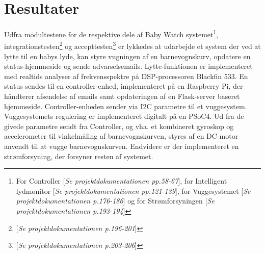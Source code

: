\chapter{Resultater}

Udfra modultestene for de respektive dele af Baby Watch systemet\footnote{For Controller [\textit{Se projektdokumentationen pp.58-67}], for Intelligent lydmonitor [\textit{Se projektdokumentationen pp.121-139}], for Vuggesystemet [\textit{Se projektdokumentationen p.176-186}] og for Strømforsyningen [\textit{Se projektdokumentationen p.193-194}]}, integrationstesten\footnote{[\textit{Se projektdokumentationen p.196-201}]} og accepttesten\footnote{[\textit{Se projektdokumentationen p.203-206}]} er lykkedes at udarbejde et system der ved at lytte til en babys lyde, kan styre vugningen af en barnevognskurv, opdatere en status-hjemmeside og sende advarselsemails. Lytte-funktionen er implementeret med realtids analyser af frekvensspektre på DSP-processoren Blackfin 533. En status sendes til en controller-enhed, implementeret på en Raspberry Pi, der håndterer afsendelse af emails samt opdateringen af en Flask-server baseret hjemmeside. Controller-enheden sender via I2C parametre til et vuggesystem. Vuggesystemets regulering er implementeret digitalt på en PSoC4. Ud fra de givede parametre sendt fra Controller, og vha. et kombineret gyroskop og accelerometer til vinkelmåling af barnevognskurven, styres af en DC-motor anvendt til at vugge barnevognskurven. Endvidere er der implementeret en strømforsyning, der forsyner resten af systemet.